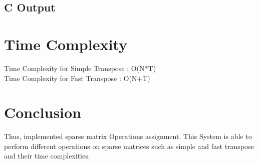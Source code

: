 \documentclass[11pt]{article}
\begin{document}


\subsection{C Output}


\section{Time Complexity}
Time Complexity for Simple Transpose : O(N*T)\\
Time Complexity for Fast Transpose : O(N+T)
\section{Conclusion}
Thus, implemented sparse matrix Operations assignment. This System is able to perform different operations on sparse matrices such as simple and fast transpose and their time complexities.
\pagebreak
\end{document}
